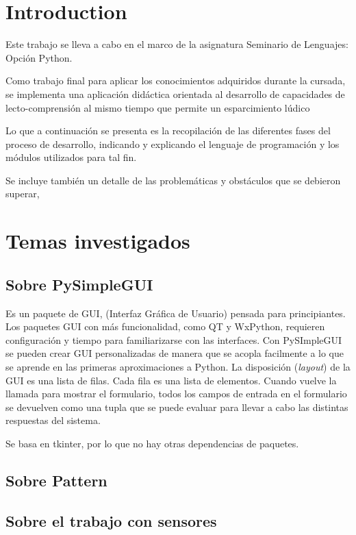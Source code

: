 \chapter{Introduction}

Este trabajo se lleva a cabo en el marco de la asignatura Seminario de Lenguajes: Opción Python.

Como trabajo final para aplicar los conocimientos adquiridos durante la cursada, se implementa una aplicación didáctica orientada al desarrollo de capacidades de lecto-comprensión al mismo tiempo que permite un esparcimiento lúdico

Lo que a continuación se presenta es la recopilación de las diferentes fases del proceso de desarrollo, indicando y explicando el lenguaje de programación y los módulos utilizados para tal fin.

Se incluye también un detalle de las problemáticas y obstáculos que se debieron superar, 

\chapter{Temas investigados}

\section{Sobre PySimpleGUI}
Es un paquete de GUI, (Interfaz Gráfica de Usuario) pensada para principiantes.
Los paquetes GUI con más funcionalidad, como QT y WxPython, requieren configuración y tiempo para familiarizarse con las interfaces.
Con PySImpleGUI se pueden crear GUI personalizadas de manera que se acopla facilmente a lo que se aprende en las primeras aproximaciones a Python. La disposición (\emph{layout}) de la GUI es una lista de filas. Cada fila es una lista de elementos. Cuando vuelve la llamada para mostrar el formulario, todos los campos de entrada en el formulario se devuelven como una tupla que se puede evaluar para llevar a cabo las distintas respuestas del sistema.

Se basa en tkinter, por lo que no hay otras dependencias de paquetes.

\section{Sobre Pattern}

\section{Sobre el trabajo con sensores}

